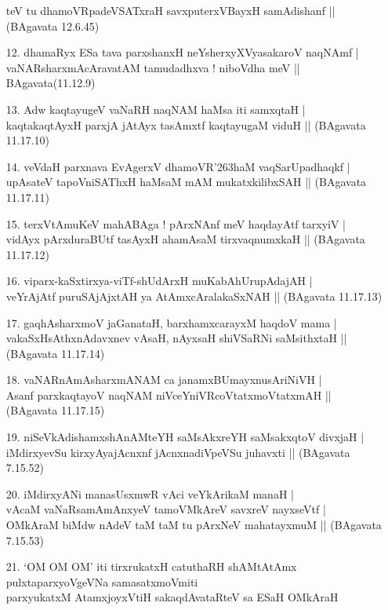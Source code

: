\begin{itemize}
teV tu dhamoVRpadeVSATxraH savxputerxVBayxH samAdishanf ||
\hfill{(BAgavata 12.6.45)}
\item[12.] dhamaRyx ESa tava parxshanxH neYsherxyXVyasakaroV naqNAmf |\\\label{145}
vaNARsharxmAcAravatAM tamudadhxva ! niboVdha meV ||
\hfill{BAgavata(11.12.9)}
\item[13.] Adw kaqtayugeV vaNaRH naqNAM haMsa iti samxqtaH |\\
kaqtakaqtAyxH parxjA jAtAyx tasAmxtf kaqtayugaM viduH ||
\hfill{(BAgavata 11.17.10)}
\item[14.] veVdaH parxnava EvAgerxV dhamoVR\char'263haM vaqSarUpadhaqkf |\\
upAsateV tapoVniSAThxH haMsaM mAM mukatxkilibxSAH ||
\hfill{(BAgavata 11.17.11)}
\item[15.] terxVtAmuKeV mahABAga ! pArxNAnf meV haqdayAtf tarxyiV |\\
vidAyx pArxduraBUtf tasAyxH ahamAsaM tirxvaqnumxkaH ||
\hfill{(BAgavata 11.17.12)}
\item[16.] viparx-kaSxtirxya-viTf-shUdArxH muKabAhUrupAdajAH |\\
veYrAjAtf puruSAjAjxtAH ya AtAmxcAralakaSxNAH ||
\hfill{(BAgavata 11.17.13)}
\item[17.] gaqhAsharxmoV jaGanataH, barxhamxcarayxM haqdoV mama |\\
vakaSxHsAthxnAdavxnev vAsaH, nAyxsaH shiVSaRNi saMsithxtaH ||
\hfill{(BAgavata 11.17.14)}
\item[18.] vaNARnAmAsharxmANAM ca janamxBUmayxnusAriNiVH |\\
Asanf parxkaqtayoV naqNAM niVceYniVRcoVtatxmoVtatxmAH ||
\hfill{(BAgavata 11.17.15)}
\item[19.] niSeVkAdishamxshAnAMteYH saMsAkxreYH saMsakxqtoV divxjaH |\\
iMdirxyevSu kirxyAyajAcnxnf jAcnxnadiVpeVSu juhavxti ||\label{146}
\hfill{(BAgavata 7.15.52)}
\item[20.] iMdirxyANi manasUsxmwR vAci veYkArikaM manaH |\\
vAcaM vaNaRsamAmAnxyeV tamoVMkAreV savxreV nayxseVtf |\\
OMkAraM biMdw nAdeV taM taM tu pArxNeV mahatayxmuM ||
\hfill{(BAgavata 7.15.53)}
\item[21.] `OM OM OM' iti tirxrukatxH catuthaRH shAMtAtAmx\\\label{146}
pulxtaparxyoVgeVNa samasatxmoVmiti\\
parxyukatxM AtamxjoyxVtiH sakaqdAvataRteV sa ESaH OMkAraH\\

\end{itemize}
